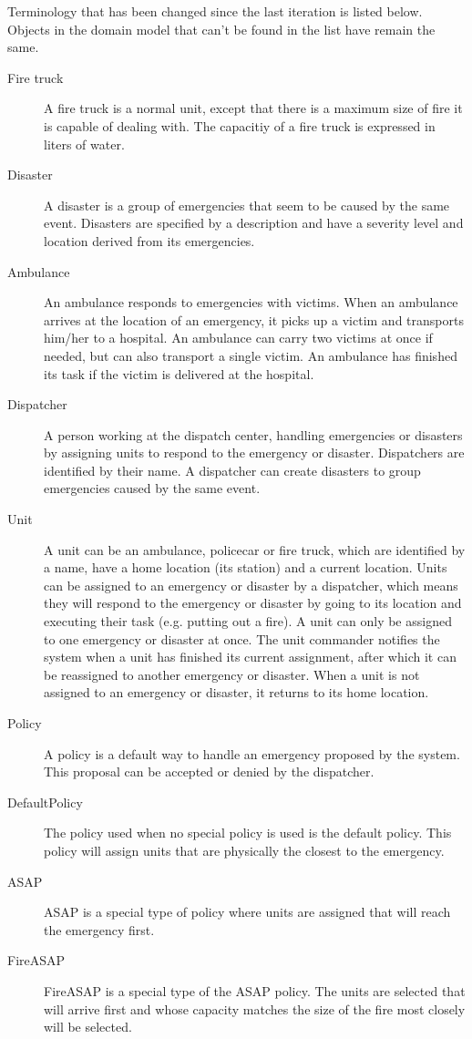 \label{terminologie}
Terminology that has been changed since the last iteration is listed below. Objects in the domain model that can't be found in the list have remain the same.
\begin{description}
  \item[Fire truck] A fire truck is a normal unit, except that there is a maximum size of fire it is capable of dealing with. The capacitiy of a fire truck is expressed in liters of water.
  \item[Disaster] A disaster is a group of emergencies that seem to be caused by the same event. Disasters are specified by a description and have a severity level and location derived from its emergencies.
  \item[Ambulance] An ambulance responds to emergencies with victims. When an ambulance arrives at the location of an emergency, it picks up a victim and transports him/her to a hospital. An ambulance can carry two victims at once if needed, but can also transport a single victim. An ambulance has finished its task if the victim is delivered at the hospital. 
  \item[Dispatcher] A person working at the dispatch center, handling emergencies or disasters by assigning units to respond to the emergency or disaster. Dispatchers are identified by their name. A dispatcher can create disasters to group emergencies caused by the same event.
  \item[Unit] A unit can be an ambulance, policecar or fire truck, which are identified by a name, have a home location (its station) and a current location. Units can be assigned to an emergency or disaster by a dispatcher, which means they will respond to the emergency or disaster by going to its location and executing their task (e.g. putting out a fire). A unit can only be assigned to one emergency or disaster at once. The unit commander notifies the system when a unit has finished its current assignment, after which it can be reassigned to another emergency or disaster. When a unit is not assigned to an emergency or disaster, it returns to its home location.
  \item[Policy] A policy is a default way to handle an emergency proposed by the system. This proposal can be accepted or denied by the dispatcher.
  \item[DefaultPolicy] The policy used when no special policy is used is the default policy. This policy will assign units that are physically the closest to the emergency.
  \item[ASAP] ASAP is a special type of policy where units are assigned that will reach the emergency first.
  \item[FireASAP] FireASAP is a special type of the ASAP policy. The units are selected that will arrive first and whose capacity matches the size of the fire most closely will be selected.
\end{description}

